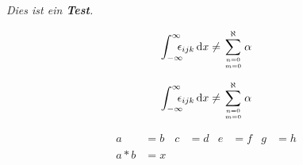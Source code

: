 \documentclass[ngerman,fleqn]{scrartcl}
\renewcommand\d{\,\mathrm d}
\begin{document}
\textit{Dies \textsf{ist} ein \textbf{Test}.}

\[\int_{-\infty}^\infty\kern-.7em \epsilon_{ijk} \d x \neq \sum_{n = 0\atop m = 0}^\aleph \alpha\]

\begin{equation}
\int_{-\infty}^\infty\kern-.7em \epsilon_{ijk} \d x \neq \sum_{n = 0\atop m = 0}^\aleph \alpha
\end{equation}

\begin{align}
a &= b & c &= d &e &= f & g &= h \\
a*b &= x\\
\end{align}



\blinddocument
\end{document}
